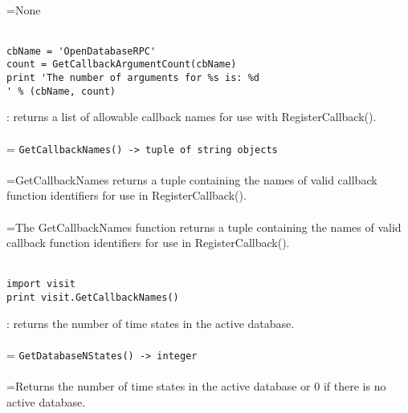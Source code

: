 \documentclass[10pt,a4paper]{report}
\begin{document}
 \\ 
\hangindent=\parindent None
\\[-3mm] 

\\[-6mm]
\begin{verbatim}cbName = 'OpenDatabaseRPC'
count = GetCallbackArgumentCount(cbName)
print 'The number of arguments for %s is: %d
' % (cbName, count)
\end{verbatim}
\newpage


{}
: returns a list of allowable callback names for use with RegisterCallback().\\[-3mm]

 \\ 
\hangindent=\parindent 
\verb!GetCallbackNames() -> tuple of string objects!\\ [-3mm]

 \\ 
\hangindent=\parindent GetCallbackNames returns a tuple containing the names of valid callback  function identifiers for use in RegisterCallback(). \\[-3mm] 

 \\ 
\hangindent=\parindent The GetCallbackNames function returns a tuple containing the names of valid  callback function identifiers for use in RegisterCallback(). \\[-3mm] 

\\[-6mm]
\begin{verbatim}import visit
print visit.GetCallbackNames()
\end{verbatim}
\newpage


{}
: returns the number of time states in the active database.\\[-3mm]

 \\ 
\hangindent=\parindent 
\verb!GetDatabaseNStates() -> integer!\\ [-3mm]

 \\ 
\hangindent=\parindent Returns the number of time states in the active database or 0 if there is no active database. \\[-3mm] 
\end{document}
